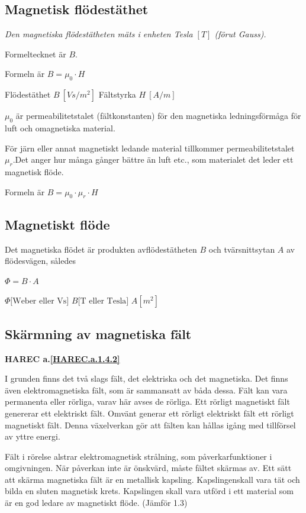 \subsection{Magnetisk flödestäthet}

\emph{Den magnetiska flödestätheten mäts i enheten Tesla \([T]\) (förut Gauss).}

Formeltecknet är \(B\).

Formeln är \(B = \mu_0 \cdot H\)

Flödestäthet \(B\ [Vs/m^2]\) Fältstyrka \(H\ [A/m]\)

\(\mu_0\) är permeabilitetstalet (fältkonstanten) för den magnetiska
ledningsförmåga för luft och omagnetiska material.

För järn eller annat magnetiskt ledande material tillkommer permeabilitetstalet
\(\mu_r\).Det anger hur många gånger bättre än luft etc., som materialet det
leder ett magnetisk flöde.

Formeln är \(B = \mu_0 \cdot \mu_r \cdot H\)

\subsection{Magnetiskt flöde}

Det magnetiska flödet är produkten avflödestätheten \(B\) och tvärsnittsytan
\(A\) av flödesvägen, således

\(\Phi = B \cdot A\)

\(\Phi \text{[Weber eller Vs]}\) \(B \text{[T eller Tesla]}\) \(A [m^2]\)

\subsection{Skärmning av magnetiska fält}
\textbf{HAREC a.\ref{HAREC.a.1.4.2}\label{myHAREC.a.1.4.2}}

I grunden finns det två slags fält, det elektriska och det magnetiska. Det
finns även elektromagnetiska fält, som är sammansatt av båda dessa. Fält kan
vara permanenta eller rörliga, varav här avses de rörliga. Ett rörligt
magnetiskt fält genererar ett elektriskt fält. Omvänt generar ett rörligt
elektriskt fält ett rörligt magnetiskt fält. Denna växelverkan gör att fälten
kan hållas igång med tillförsel av yttre energi.

Fält i rörelse alstrar elektromagnetisk strålning, som påverkarfunktioner i
omgivningen. När påverkan inte är önskvärd, måste fältet skärmas av. Ett sätt
att skärma magnetiska fält är en metallisk kapsling. Kapslingenskall vara tät
och bilda en sluten magnetisk krets. Kapslingen skall vara utförd i ett
material som är en god ledare av magnetiskt flöde.
(Jämför 1.3)
